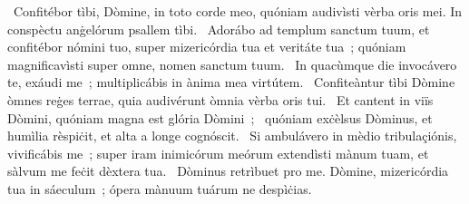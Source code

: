 \psalmChapterWithInscription{}
{ }
{%
~Confitébor tìbi, Dòmine, in toto corde meo, quóniam audivìsti vèrba oris mei. In conspèctu anġelórum psallem tìbi. 
~Adorábo ad templum sanctum tuum, et confitébor nómini tuo, super mizericórdia tua et veritáte tua~; quóniam magnificavìsti super omne, nomen sanctum tuum. 
~In quacùmque die invocávero te, exáudi me~; multiplicábis in ànima mea virtútem. 
~Confiteàntur tìbi Dòmine òmnes reġes terrae, quia audivérunt òmnia vèrba oris tui. 
~Et cantent in viïs Dòmini, quóniam magna est glória Dòmini~; 
~quóniam exċèlsus Dòminus, et humìlia rèspiċit, et alta a longe cognóscit. 
~Si ambulávero in mèdio tribulaçiónis, vivificábis me~; super iram inimicórum meórum extendìsti mànum tuam, et sàlvum me feċit dèxtera tua. 
~Dòminus retrìbuet pro me. Dòmine, mizericórdia tua in sáeculum~; ópera mànuum tuárum ne despìċias. 
}
